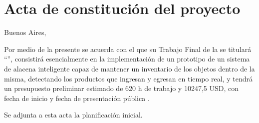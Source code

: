 \documentclass[
11pt, %
codirector, %
]{charter}
\begin{document}
\pagebreak



\section*{Acta de constitución del proyecto}
\label{sec:acta}

\begin{flushright}
Buenos Aires, \fechaInicioName
\end{flushright}

\vspace{2cm}

Por medio de la presente se acuerda con el \authorname\hspace{1px} que su Trabajo Final de la \degreename\hspace{1px} se titulará ``\ttitle'', consistirá esencialmente en la implementación de un prototipo de un sistema de alacena inteligente capaz de mantener un inventario de los objetos dentro de la misma, detectando los productos que ingresan y egresan en tiempo real, y tendrá un presupuesto preliminar estimado de 620 h de trabajo y 10247,5 USD, con fecha de inicio \fechaInicioName\hspace{1px} y fecha de presentación pública \fechaFinalName.

Se adjunta a esta acta la planificación inicial.

\vfill
\end{document}
